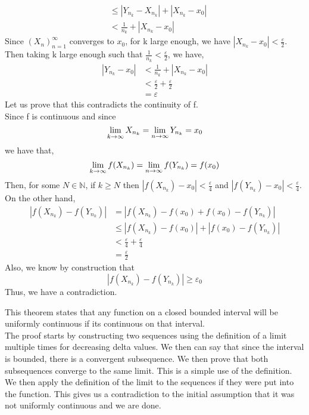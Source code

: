 \documentclass[12pt]{article}
\begin{document}
\begin{prf}{}
\begin{align*}
    &\le |Y_{n_k} - X_{n_k}| + |X_{n_k} - x_0|\\
    &< \frac{1}{n_k} + |X_{n_k} - x_0|
\end{align*}
Since \(\left(X_n\right)_{n=1}^\infty\) converges to \(x_0\), for k large enough, we have \(|X_{n_k} - x_0| < \frac{\varepsilon}{2}\).\\
Then taking k large enough such that \(\frac{1}{n_k} < \frac{\varepsilon}{2}\), we have, 
\begin{align*}
    |Y_{n_k} - x_0| &< \frac{1}{n_k} + |X_{n_k} - x_0|\\
    &< \frac{\varepsilon}{2} + \frac{\varepsilon}{2}\\
    &= \varepsilon
\end{align*}
Let us prove that this contradicts the continuity of f.\\
Since f is continuous and since \[\displaystyle\lim_{k\to\infty}X_{n_k} = \displaystyle\lim_{n\to\infty}Y_{n_k} = x_0\]
we have that, 
\[\displaystyle\lim_{k\to\infty}f(X_{n_k}) = \displaystyle\lim_{n\to\infty}f(Y_{n_k}) = f(x_0)\]
Then, for some \(N \in \mathbb N\), if \(k \ge N\) then \(|f(X_{n_k}) - x_0| < \frac{\varepsilon}{4}\) and \(|f(Y_{n_k}) - x_0| < \frac{\varepsilon}{4}\).\\
On the other hand, 
\begin{align*}
    |f(X_{n_k}) - f(Y_{n_k})| &= |f(X_{n_k}) - f(x_0)  + f(x_0) - f(Y_{n_k})|\\
    &\le |f(X_{n_k}) - f(x_0)| + |f(x_0) - f(Y_{n_k})|\\
    &< \frac{\varepsilon}{4} + \frac{\varepsilon}{4}\\
    &= \frac{\varepsilon}{2}
\end{align*}
Also, we know by construction that \[|f(X_{n_k}) - f(Y_{n_k})| \ge \varepsilon_0\]
Thus, we have a contradiction.
\end{prf}
\begin{explanation}{}
    This theorem states that any function on a closed bounded interval will be uniformly continuous if its continuous on that interval.\\
    The proof starts by constructing two sequences using the definition of a limit multiple times for decreasing delta values. We then can say that since the interval is bounded, there is a convergent subsequence. We then prove that both subsequences converge to the same limit. This is a simple use of the definition. \\
    We then apply the definition of the limit to the sequences if they were put into the function. This gives us a contradiction to the initial assumption that it was not uniformly continuous and we are done.\\
\end{explanation}
\end{document}
